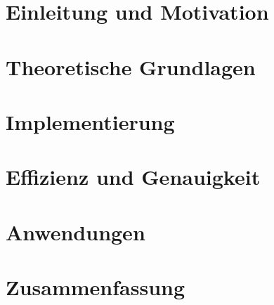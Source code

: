 \documentclass[
  paper=A4, 		%
  pagesize, 		%
  DIV=12, 		%
  ngerman,  		%
  12pt, 			%
  listof=totoc, 
  bibliography=totoc, 
  index=totoc, 
  BCOR15mm, 			%
  openany, 
]{scrbook}
\begin{document}
\newcommand{\iu}{\mathrm{i}\mkern1mu}
\newcommand*\diff{\mathop{}\!\mathrm{d}}
\newcommand*\Diff[1]{\mathop{}\!\mathrm{d^#1}}

\frontmatter
 
\restoregeometry
\thispagestyle{empty}
\cleardoublepage

  



\setcounter{secnumdepth}{5}
\setcounter{tocdepth}{5}
\tableofcontents

\mainmatter %

\chapter{Einleitung und Motivation}


\chapter{Theoretische Grundlagen}\label{chap2}


\chapter{Implementierung}\label{chap3}


\chapter{Effizienz und Genauigkeit}\label{chap4}


\chapter{Anwendungen}\label{chap5}


\chapter{Zusammenfassung}\label{chap6}

\end{document}
